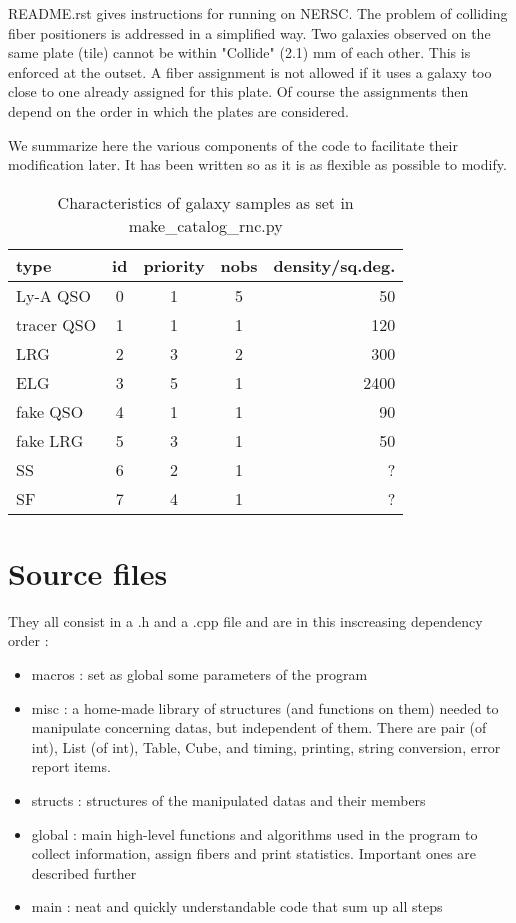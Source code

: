 \documentclass{article}
\begin{document}
  
  README.rst gives instructions for running on NERSC.  The problem of colliding fiber positioners is addressed in a simplified way.  Two galaxies observed on the same plate (tile) cannot be within "Collide" (2.1) mm of each other.  This is enforced at the outset. A fiber assignment is not allowed if it uses a galaxy too close to one already assigned for this plate.  Of course the assignments then depend on the order in which the plates are considered.  
  
  We summarize here the various components of the code to facilitate their modification later. It has been written so as it is as flexible as possible to modify.

  \begin{table}\begin{center}
  \caption{Characteristics of galaxy samples as set in make\_catalog\_rnc.py}\label{tab:characteristics}
  \begin{tabular}{lcccr}\\ \hline
  type&id&priority&nobs&density/sq.deg.\\ \hline
  Ly-A QSO & 0 & 1 & 5 &  50\\
  tracer QSO & 1 & 1 & 1& 120\\
  LRG & 2 & 3 &2 & 300\\
  ELG & 3 & 5 & 1 & 2400\\
  fake QSO & 4 & 1 & 1& 90\\
  fake LRG & 5 & 3 & 1 & 50\\
  SS & 6 & 2 & 1&  ?\\
  SF & 7 & 4 & 1& ?\\ \hline
    \end{tabular}\end{center}
  \end{table}


 \section{Source files}
 They all consist in a .h and a .cpp file and are in this inscreasing dependency order :
       \begin{itemize} 
	       \item macros : set as global some parameters of the program
	       \item misc : a home-made library of structures (and functions on them) needed to manipulate concerning datas, but independent of them. There are pair (of int), List (of int), Table, Cube, and timing, printing, string conversion, error report items.
	       \item structs : structures of the manipulated datas and their members
	       \item global : main high-level functions and algorithms used in the program to collect information, assign fibers and print statistics. Important ones are described further
	       \item main : neat and quickly understandable code that sum up all steps
       \end{itemize} 
\end{document}

